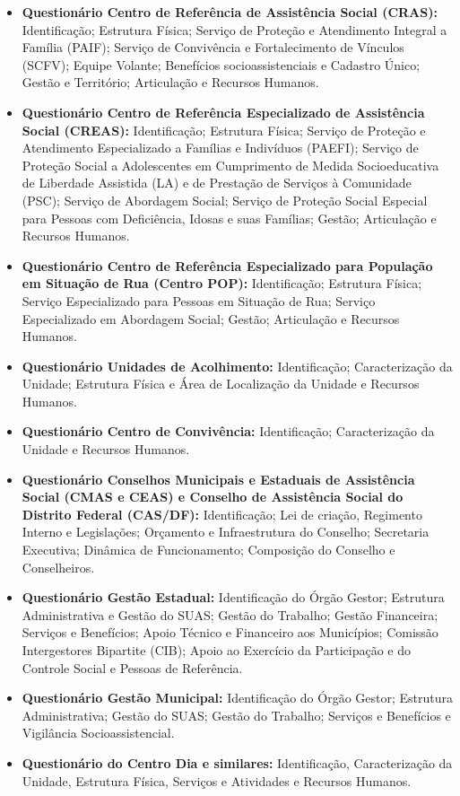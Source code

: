 \documentclass[brazilian]{report}
\begin{document}
\begin{itemize}
  \item 
\textbf{Questionário Centro de Referência de Assistência Social (CRAS):} Identificação; Estrutura Física; Serviço de Proteção e Atendimento Integral a Família (PAIF); Serviço de Convivência e Fortalecimento de Vínculos (SCFV); Equipe Volante; Benefícios socioassistenciais e Cadastro Único; Gestão e Território; Articulação e Recursos Humanos.
  \item 
\textbf{Questionário Centro de Referência Especializado de Assistência Social (CREAS):} Identificação; Estrutura Física; Serviço de Proteção e Atendimento Especializado a Famílias e Indivíduos (PAEFI); Serviço de Proteção Social a Adolescentes em Cumprimento de Medida Socioeducativa de Liberdade Assistida (LA) e de Prestação de Serviços à Comunidade (PSC); Serviço de Abordagem Social; Serviço de Proteção Social Especial para Pessoas com Deficiência, Idosas e suas Famílias; Gestão; Articulação e Recursos Humanos.
  \item 
\textbf{Questionário Centro de Referência Especializado para População em Situação de Rua (Centro POP):} Identificação; Estrutura Física; Serviço Especializado para Pessoas em Situação de Rua; Serviço Especializado em Abordagem Social; Gestão; Articulação e Recursos Humanos.
  \item 
\textbf{Questionário Unidades de Acolhimento:} Identificação; Caracterização da Unidade; Estrutura Física e Área de Localização da Unidade e Recursos Humanos.
  \item 
\textbf{Questionário Centro de Convivência:} Identificação; Caracterização da Unidade e Recursos Humanos.
  \item 
\textbf{Questionário Conselhos Municipais e Estaduais de Assistência Social (CMAS e CEAS) e Conselho de Assistência Social do Distrito Federal (CAS/DF):} Identificação; Lei de criação, Regimento Interno e Legislações; Orçamento e Infraestrutura do Conselho; Secretaria Executiva; Dinâmica de Funcionamento; Composição do Conselho e Conselheiros.
  \item 
\textbf{Questionário Gestão Estadual:} Identificação do Órgão Gestor; Estrutura Administrativa e Gestão do SUAS; Gestão do Trabalho; Gestão Financeira; Serviços e Benefícios; Apoio Técnico e Financeiro aos Municípios; Comissão Intergestores Bipartite (CIB); Apoio ao Exercício da Participação e do Controle Social e Pessoas de Referência.
  \item 
\textbf{Questionário Gestão Municipal:} Identificação do Órgão Gestor; Estrutura Administrativa; Gestão do SUAS; Gestão do Trabalho; Serviços e Benefícios e Vigilância Socioassistencial.
  \item 
\textbf{Questionário do Centro Dia e similares:} Identificação, Caracterização da Unidade, Estrutura Física, Serviços e Atividades e Recursos Humanos.
\end{itemize}
\end{document}
